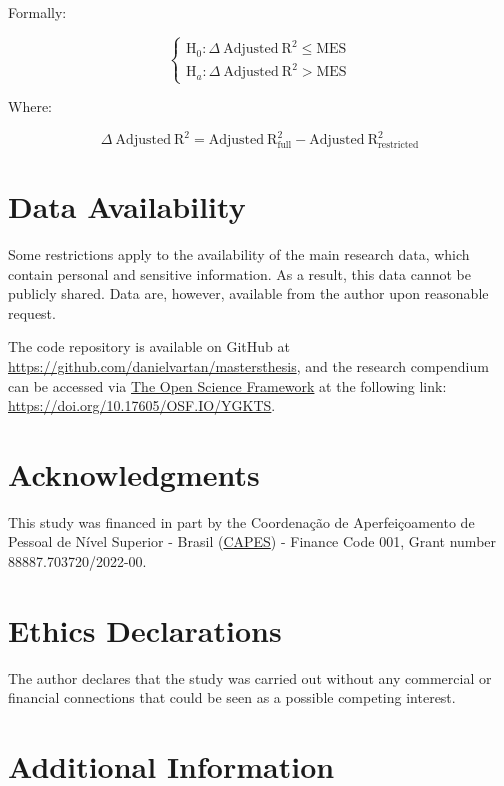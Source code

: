 \documentclass[
12pt,
openright,
oneside,
a4paper,
chapter=TITLE,
section=TITLE,
french,
spanish,
brazil,
english
]{abntex2}
\begin{document}
Formally:

\[
\begin{cases}
\text{H}_{0}: \Delta \ \text{Adjusted} \ \text{R}^{2} \leq \text{MES} \\
\text{H}_{a}: \Delta \ \text{Adjusted} \ \text{R}^{2} > \text{MES}
\end{cases}
\]

\medskip

Where:

\[
\Delta \ \text{Adjusted} \ \text{R}^{2} = \text{Adjusted} \ \text{R}^{2}_{\text{full}} - \text{Adjusted} \ \text{R}^{2}_{\text{restricted}}
\]

\medskip

\section{Data Availability}\label{data-availability}

Some restrictions apply to the availability of the main research data,
which contain personal and sensitive information. As a result, this data
cannot be publicly shared. Data are, however, available from the author
upon reasonable request.

The code repository is available on GitHub at
\url{https://github.com/danielvartan/mastersthesis}, and the research
compendium can be accessed via \href{https://osf.io/}{The Open Science
Framework} at the following link:
\url{https://doi.org/10.17605/OSF.IO/YGKTS}.

\section{Acknowledgments}\label{acknowledgments}

This study was financed in part by the Coordenação de Aperfeiçoamento de
Pessoal de Nível Superior - Brasil
(\href{https://www.gov.br/capes/}{CAPES}) - Finance Code 001, Grant
number 88887.703720/2022-00.

\section{Ethics Declarations}\label{ethics-declarations}

The author declares that the study was carried out without any
commercial or financial connections that could be seen as a possible
competing interest.

\section{Additional Information}\label{additional-information}
\end{document}
